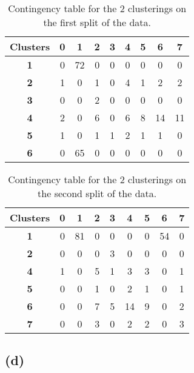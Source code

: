 \documentclass[12pt]{report} %
\begin{document}
\begin{table}[h]
\centering
\begin{tabular}{ |c|c|c|c|c|c|c|c|c| }
    \hline
    \textbf{Clusters} & \textbf{0} & \textbf{1} & \textbf{2} & \textbf{3} & \textbf{4} & \textbf{5} & \textbf{6} & \textbf{7} \\ 
    \hline
    \textbf{1} & 0 & 72 & 0 & 0 & 0 & 0 & 0 & 0 \\
    \hline
    \textbf{2} & 1 & 0 & 1 & 0 & 4 & 1 & 2 & 2 \\
    \hline
    \textbf{3} & 0 & 0 & 2 & 0 & 0 & 0 & 0 & 0 \\
    \hline
    \textbf{4} & 2 & 0 & 6 & 0 & 6 & 8 & 14 & 11 \\
    \hline
    \textbf{5} & 1 & 0 & 1 & 1 & 2 & 1 & 1 & 0 \\
    \hline
    \textbf{6} & 0 & 65 & 0 & 0 & 0 & 0 & 0 & 0 \\
    \hline

\end{tabular}
\caption{Contingency table for the 2 clusterings on the first split of the data.}
\end{table}


\begin{table}[h]
    \centering
    \begin{tabular}{ |c|c|c|c|c|c|c|c|c| }
        \hline
        \textbf{Clusters} & \textbf{0} & \textbf{1} & \textbf{2} & \textbf{3} & \textbf{4} & \textbf{5} & \textbf{6} & \textbf{7} \\ 
        \hline
        \textbf{1} & 0 & 81 & 0 & 0 & 0 & 0 & 54 & 0 \\
        \hline
        \textbf{2} & 0 & 0 & 0 & 3 & 0 & 0 & 0 & 0 \\
        \hline
        \textbf{4} & 1 & 0 & 5 & 1 & 3 & 3 & 0 & 1 \\
        \hline
        \textbf{5} & 0 & 0 & 1 & 0 & 2 & 1 & 0 & 1 \\
        \hline
        \textbf{6} & 0 & 0 & 7 & 5 & 14 & 9 & 0 & 2 \\
        \hline
        \textbf{7} & 0 & 0 & 3 & 0 & 2 & 2 & 0 & 3 \\
        \hline
    
    \end{tabular}
    \caption{Contingency table for the 2 clusterings on the second split of the data.}
\end{table}

\subsection*{(d)}
\end{document}
